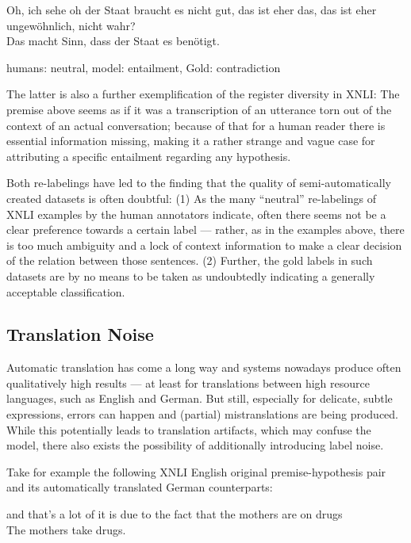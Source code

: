 {\begin{examples}
  \item Oh, ich sehe oh der Staat braucht es nicht gut, das ist eher das, das ist eher ungewöhnlich, nicht wahr?\\
        Das macht Sinn, dass der Staat es benötigt.

        humans: neutral, model: entailment, Gold: contradiction
\end{examples}

The latter is also a further exemplification of the register diversity in XNLI: The premise above seems as if it
was a transcription of an utterance torn out of the context of an actual conversation; because of that for a human
reader there is essential information missing, making it a rather strange and vague case for attributing
a specific entailment regarding any hypothesis.


Both re-labelings have led to the finding that the quality of semi-automatically created
datasets is often doubtful: (1) As the many ``neutral'' re-labelings of XNLI examples
by the human annotators indicate, often there seems not be a clear preference towards a
certain label --- rather, as in the examples above, there is too much ambiguity and a lock
of context information to make a clear decision of the relation between those sentences.
(2) Further, the gold labels in such datasets are by no means to be taken as undoubtedly
indicating a generally acceptable classification.



\subsection{Translation Noise}
\label{sec:translation-noise}

Automatic translation has come a long way and systems nowadays produce often qualitatively
high results --- at least for translations between high resource languages, such as English
and German. But still, especially for delicate, subtle expressions, errors can happen and
(partial) mistranslations are being produced. While this potentially leads to translation
artifacts, which may confuse the model, there also exists the possibility of additionally
introducing label noise.

Take for example the following XNLI English original premise-hypothesis pair and its automatically
translated German counterparts:

\begin{examples}
  \item and that's a lot of it is due to the fact that the mothers are on drugs\\
        The mothers take drugs.


\end{examples}}
